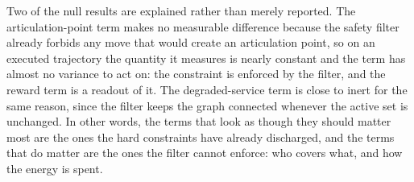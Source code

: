 \documentclass[conference]{IEEEtran}
\begin{document}
Two of the null results are explained rather than merely reported.  The
articulation-point term makes no measurable difference because the safety
filter already forbids any move that would create an articulation point, so
on an executed trajectory the quantity it measures is nearly constant and
the term has almost no variance to act on: the constraint is enforced by the
filter, and the reward term is a readout of it.  The degraded-service term
is close to inert for the same reason, since the filter keeps the graph
connected whenever the active set is unchanged.  In other words, the terms
that look as though they should matter most are the ones the hard
constraints have already discharged, and the terms that do matter are the
ones the filter cannot enforce: who covers what, and how the energy is
spent.

\begin{table}[t]
\ifdefined\tbltheme\else
\fi


\end{table}
\end{document}
